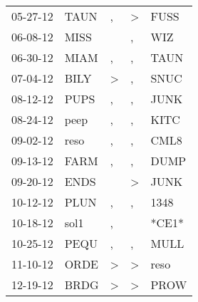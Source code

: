 \begin{supertabular}{p{0.07\textwidth}p{0.06\textwidth}p{0.02\textwidth}p{0.02\textwidth}p{0.06\textwidth}}
          05-27-12\textsuperscript{} &           TAUN\textsuperscript{} &                , &     \textgreater &           FUSS\textsuperscript{} \\
          06-08-12\textsuperscript{} &           MISS\textsuperscript{} &                  &                , &            WIZ\textsuperscript{} \\
          06-30-12\textsuperscript{} &           MIAM\textsuperscript{} &                , &                , &           TAUN\textsuperscript{} \\
          07-04-12\textsuperscript{} &           BILY\textsuperscript{} &     \textgreater &                , &           SNUC\textsuperscript{} \\
          08-12-12\textsuperscript{} &           PUPS\textsuperscript{} &                , &                , &           JUNK\textsuperscript{} \\
          08-24-12\textsuperscript{} &           peep\textsuperscript{} &                , &                , &           KITC\textsuperscript{} \\
          09-02-12\textsuperscript{} &           reso\textsuperscript{} &                , &                , &           CML8\textsuperscript{} \\
          09-13-12\textsuperscript{} &           FARM\textsuperscript{} &                , &                , &           DUMP\textsuperscript{} \\
          09-20-12\textsuperscript{} &           ENDS\textsuperscript{} &                  &     \textgreater &           JUNK\textsuperscript{} \\
          10-12-12\textsuperscript{} &           PLUN\textsuperscript{} &                , &                , &           1348\textsuperscript{} \\
          10-18-12\textsuperscript{} &           sol1\textsuperscript{} &                , &                  &                            *CE1* \\
          10-25-12\textsuperscript{} &           PEQU\textsuperscript{} &                , &                , &           MULL\textsuperscript{} \\
          11-10-12\textsuperscript{} &           ORDE\textsuperscript{} &     \textgreater &     \textgreater &           reso\textsuperscript{} \\
          12-19-12\textsuperscript{} &           BRDG\textsuperscript{} &     \textgreater &     \textgreater &           PROW\textsuperscript{} \\

\end{supertabular}
